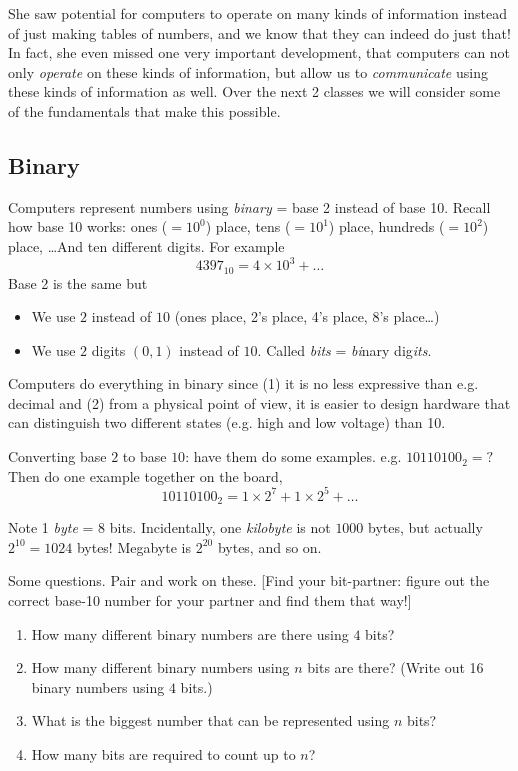 \documentclass{article}
\begin{document}
She saw potential for computers to operate on many kinds of
information instead of just making tables of numbers, and we know that
they can indeed do just that!  In fact, she even missed one very
important development, that computers can not only \emph{operate} on
these kinds of information, but allow us to \emph{communicate} using
these kinds of information as well.  Over the next 2 classes we will
consider some of the fundamentals that make this possible.

\subsection*{Binary}

Computers represent numbers using \emph{binary} = base 2 instead of
base 10.  Recall how base 10 works: ones ($=10^0$) place, tens
($=10^1$) place, hundreds ($=10^2$) place, \dots  And ten different
digits.  For example \[ 4397_{10} = 4 \times 10^3 + \dots \] Base 2 is
the same but
\begin{itemize}
\item We use $2$ instead of $10$ (ones place, 2's place, 4's place,
  8's place\dots)
\item We use $2$ digits $(0,1)$ instead of $10$.  Called \emph{bits} =
  \emph{bi}nary dig\emph{its}.
\end{itemize}
Computers do everything in binary since (1) it is no less expressive
than e.g. decimal and (2) from a physical point of view, it is easier
to design hardware that can distinguish two different states
(e.g. high and low voltage) than 10.

Converting base $2$ to base $10$: have them do some
examples. e.g. $10110100_2 = ?$  Then do one example together on the
board, \[ 10110100_2 = 1 \times 2^7 + 1 \times 2^5 + \dots \]

Note 1 \emph{byte} = 8 bits.  Incidentally, one \emph{kilobyte} is not
$1000$ bytes, but actually $2^{10} = 1024$ bytes!  Megabyte is
$2^{20}$ bytes, and so on.

Some questions.  Pair and work on these. [Find your bit-partner:
figure out the correct base-10 number for your partner and find them
that way!]

\begin{enumerate}
\item How many different binary numbers are there using $4$ bits?
\item How many different binary numbers using $n$ bits are there?
  (Write out 16 binary numbers using $4$ bits.)
\item What is the biggest number that can be represented using $n$
  bits?
\item How many bits are required to count up to $n$?
\end{enumerate}
\end{document}
